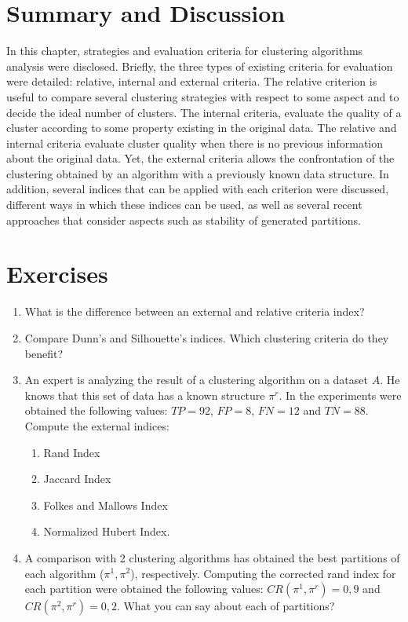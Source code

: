 \section{Summary and Discussion}
In this chapter, strategies and evaluation criteria for clustering algorithms analysis were disclosed.
Briefly, the three types of existing criteria for evaluation were detailed: relative, internal and external criteria. The relative criterion is useful to compare several clustering strategies with respect to some aspect and to decide the ideal number of clusters. The internal criteria, evaluate the quality of a cluster according to some property existing in the original data. The relative and internal criteria evaluate cluster quality when there is no previous information about the original data. Yet, the external criteria allows the confrontation of the clustering obtained by an algorithm with a previously known data structure.
In addition, several indices that can be applied with each criterion were discussed, different ways in which these indices can be used,
as well as several recent approaches that consider aspects such as stability of generated partitions.


\section{Exercises}


\begin{enumerate}
    \item What is the difference between an external and relative criteria index?

    \item Compare Dunn's and Silhouette's indices. Which clustering criteria do they benefit?

    \item An expert is analyzing the result of a clustering algorithm on a dataset $A$. He knows that this set of data has a known structure $\pi^r$. In the experiments were obtained the following values: $TP=92$, $FP=8$, $FN=12$ and $TN=88$. Compute the external indices: 

    \begin{enumerate}
        \item Rand Index 

        \item Jaccard Index 

        \item Folkes and Mallows Index 

        \item Normalized Hubert Index. 
        
    \end{enumerate}

    \item A comparison with 2 clustering algorithms has obtained the best partitions of each algorithm ($\pi^1,\pi^2$), respectively. Computing the corrected rand index for each partition were obtained the following values: $CR(\pi^1, \pi^r)=0,9$ and $CR(\pi^2, \pi^r)=0,2$. What you can say about each of partitions?
    
\end{enumerate}


